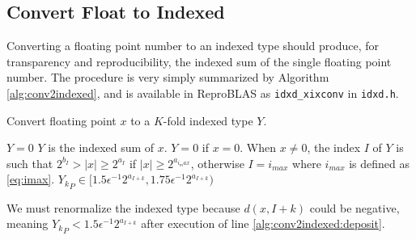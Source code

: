 \subsection{Convert Float to Indexed}
    \label{sec:primitiveops_conv2indexed}
    Converting a floating point number to an indexed type should produce, for
    transparency and reproducibility, the indexed sum of the single floating
    point number.
    The procedure is very simply summarized by Algorithm \ref{alg:conv2indexed}, and is available in ReproBLAS as \texttt{idxd\_xixconv} in \texttt{idxd.h}.

    \begin{samepage}
    \begin{alg}
      Convert floating point $x$ to a $K$-fold indexed type $Y$.
      \begin{algorithmic}[1]
          \State $Y = 0$
          \State {}
          \State {} \label{alg:conv2indexed:deposit}
          \State {}
        \EndFunction
        \Ensure
          $Y$ is the indexed sum of $x$. $Y=0$ if $x=0$.
          When $x \neq 0$, the index $I$ of $Y$ is such that $2^{b_I} > |x| \geq 2^{a_I}$
          if $|x| \geq 2^{a_{i_max}}$, otherwise $I = i_{max}$ where $i_{max}$ is defined as \eqref{eq:imax}.
          ${Y_k}_P \in [1.5  \epsilon^{-1} 2^{a_{I + k}}, 1.75  \epsilon^{-1} 2^{a_{I + k}})$
      \end{algorithmic}
      \label{alg:conv2indexed}
    \end{alg}
    \end{samepage}

    We must renormalize the indexed type because $d(x, I + k)$ could be
    negative, meaning ${Y_k}_P < 1.5  \epsilon^{-1} 2^{a_{I + k}}$ after
    execution of line \ref{alg:conv2indexed:deposit}.

